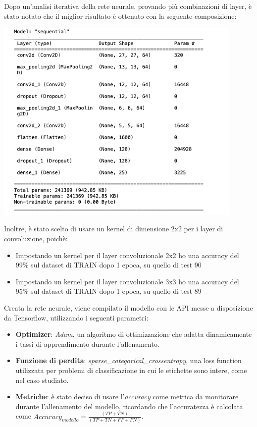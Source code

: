 \documentclass{article}
\begin{document}
Dopo un'analisi iterativa della rete neurale, provando più combinazioni di layer, è stato notato che il miglior risultato è ottenuto con la seguente composizione:
\begin{center}
    \includegraphics[width=0.9\textwidth]{layers.png}
\end{center}
Inoltre, è stato scelto di usare un kernel di dimensione 2x2 per i layer di convoluzione, poichè:
\begin{itemize}
    \item Impostando un kernel per il layer convoluzionale 2x2 ho una accuracy del 99\% sul dataset di TRAIN dopo 1 epoca, su quello di test 90%
    \item Impostando un kernel per il layer convoluzionale 3x3 ho una accuracy del 95\% sul dataset di TRAIN dopo 1 epoca, su quello di test 89%
\end{itemize}
Creata la rete neurale, viene compilato il modello con le API messe a disposizione da Tensorflow, utilizzando i seguenti parametri:
\begin{itemize}
    \item \textbf{Optimizer}: \textit{Adam}, un algoritmo di ottimizzazione che adatta dinamicamente i tassi di apprendimento durante l'allenamento.
    \item \textbf{Funzione di perdita}: \textit{sparse\_categorical\_crossentropy}, una loss function utilizzata per problemi di classificazione in cui le etichette sono intere, come nel caso studiato.
    \item \textbf{Metriche}: è stato deciso di usare l'\textit{accuracy} come metrica da monitorare durante l'allenamento del modello, ricordando che l'accuratezza è calcolata come $Accuracy_{modello} = \frac{(TP + TN)}{(TP + TN + FP + FN)}$.
\end{itemize}
\end{document}
